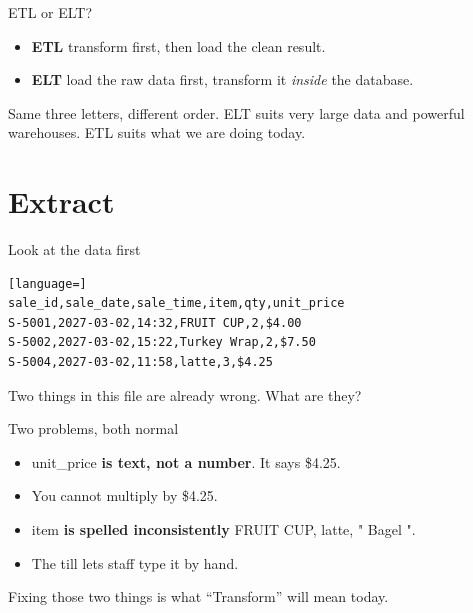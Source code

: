 \documentclass[aspectratio=169,10pt]{beamer}
\newcommand{\py}[1]{{\ttfamily\footnotesize\color{ink}#1}}
\begin{document}
\begin{frame}{ETL or ELT?}
  \begin{itemize}[<+->]
    \item \textbf{ETL} \textemdash{} transform first, then load the clean result.
    \item \textbf{ELT} \textemdash{} load the raw data first, transform it \emph{inside} the database.
  \end{itemize}

  \pause\vfill
  \begin{aside}
    \small
    Same three letters, different order. ELT suits very large data and powerful warehouses.
    ETL suits what we are doing today.
  \end{aside}
\end{frame}

\section{Extract}

\begin{frame}[fragile]{Look at the data first}
\begin{lstlisting}[language=]
sale_id,sale_date,sale_time,item,qty,unit_price
S-5001,2027-03-02,14:32,FRUIT CUP,2,$4.00
S-5002,2027-03-02,15:22,Turkey Wrap,2,$7.50
S-5004,2027-03-02,11:58,latte,3,$4.25
\end{lstlisting}

  \pause
  \begin{ask}
    \small
    Two things in this file are already wrong. What are they?
  \end{ask}
\end{frame}

\begin{frame}{Two problems, both normal}
  \begin{itemize}[<+->]
    \item \py{unit\_price} \textbf{is text, not a number}. It says \py{\$4.25}.
    \item You cannot multiply by \py{\$4.25}.
    \item \py{item} \textbf{is spelled inconsistently} \textemdash{} \py{FRUIT CUP}, \py{latte},
          \py{"  Bagel "}.
    \item The till lets staff type it by hand.
  \end{itemize}

  \pause\vfill
  \begin{aside}
    \small
    Fixing those two things is what ``Transform'' will mean today.
  \end{aside}
\end{frame}
\end{document}
